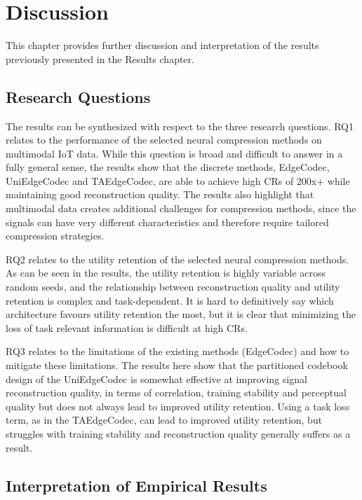\chapter{Discussion}

This chapter provides further discussion and interpretation of the results previously presented in the Results chapter. 

\section{Research Questions} 

The results can be synthesized with respect to the three research questions. RQ1 relates to the performance of the selected neural compression methods on multimodal IoT data. While this question is broad and difficult to answer in a fully general sense, the results show that the discrete methods, EdgeCodec, UniEdgeCodec and TAEdgeCodec, are able to achieve high CRs of 200x+ while maintaining good reconstruction quality. The results also highlight that multimodal data creates additional challenges for compression methods, since the signals can have very different characteristics and therefore require tailored compression strategies. 

RQ2 relates to the utility retention of the selected neural compression methods. As can be seen in the results, the utility retention is highly variable across random seeds, and the relationship between reconstruction quality and utility retention is complex and task-dependent. It is hard to definitively say which architecture favours utility retention the most, but it is clear that minimizing the loss of task relevant information is difficult at high CRs. 

RQ3 relates to the limitations of the existing methods (EdgeCodec) and how to mitigate these limitations. The results here show that the partitioned codebook design of the UniEdgeCodec is somewhat effective at improving signal reconstruction quality, in terms of correlation, training stability and perceptual quality but does not always lead to improved utility retention. Using a task loss term, as in the TAEdgeCodec, can lead to improved utility retention, but struggles with training stability and reconstruction quality generally suffers as a result. 

\section{Interpretation of Empirical Results} 

